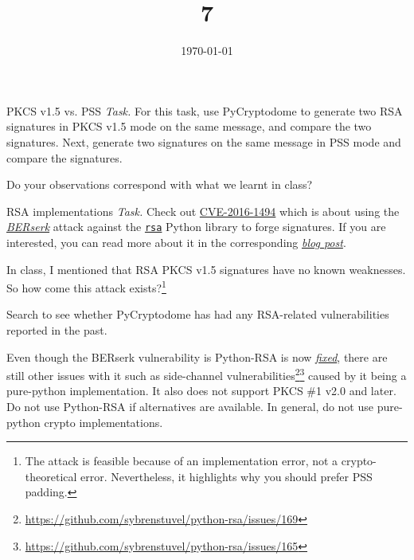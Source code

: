 \documentclass{practice}
\title{7}
\date{\today}
\begin{document}
\maketitle

\begin{task}{PKCS v1.5 vs. PSS}
  \textit{Task.}
  For this task, use PyCryptodome to generate two RSA signatures in PKCS v1.5 mode on the same message, and compare the two signatures.
  Next, generate two signatures on the same message in PSS mode and compare the signatures.
  
  Do your observations correspond with what we learnt in class?
\end{task}

\begin{task}{RSA implementations}
  \textit{Task.}
  Check out \href{https://nvd.nist.gov/vuln/detail/CVE-2016-1494}{CVE-2016-1494} which is about using the \href{https://www.darkreading.com/cyberattacks-data-breaches/-berserk-bug-uncovered-in-mozilla-nss-crypto-library-impacts-firefox-chrome}{\textit{BERserk}} attack against the \href{https://github.com/sybrenstuvel/python-rsa}{\texttt{rsa}} Python library to forge signatures.
  If you are interested, you can read more about it in the corresponding \href{https://words.filippo.io/bleichenbacher-06-signature-forgery-in-python-rsa/}{\textit{blog post}}.

  In class, I mentioned that RSA PKCS v1.5 signatures have no known weaknesses.
  So how come this attack exists?\footnote{The attack is feasible because of an implementation error, not a crypto-theoretical error.
  Nevertheless, it highlights why you should prefer PSS padding.} 

  Search to see whether PyCryptodome has had any RSA-related vulnerabilities reported in the past.

  \begin{tcolorbox}[title=Warning]
    Even though the BERserk vulnerability is Python-RSA is now \href{https://github.com/sybrenstuvel/python-rsa/commit/ab5d21c3b554f926d51ff3ad9c794bcf32e95b3c}{\textit{fixed}}, there are still other issues with it such as side-channel vulnerabilities\footnote{\url{https://github.com/sybrenstuvel/python-rsa/issues/169}}\footnote{\url{https://github.com/sybrenstuvel/python-rsa/issues/165}} caused by it being a pure-python implementation.
    It also does not support PKCS \#1 v2.0 and later.
    \tcblower
    Do not use Python-RSA if alternatives are available.
    In general, do not use pure-python crypto implementations.
  \end{tcolorbox}
\end{task}
\end{document}
